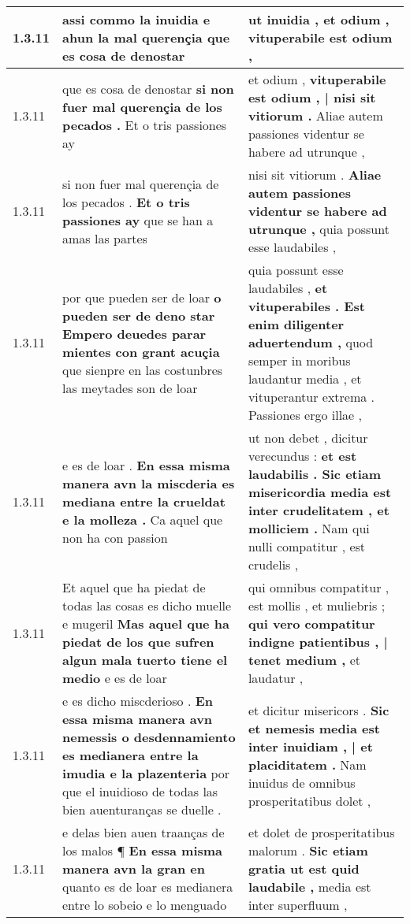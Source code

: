 \begin{tabular}{|p{1cm}|p{6.5cm}|p{6.5cm}|}
1.3.11 & assi commo la inuidia \textbf{ e ahun la mal querençia } que es cosa de denostar & ut inuidia , \textbf{ et odium , } vituperabile est odium , \\\hline
1.3.11 & que es cosa de denostar \textbf{ si non fuer mal querençia de los pecados . } Et o tris passiones ay & et odium , \textbf{ vituperabile est odium , | nisi sit vitiorum . } Aliae autem passiones videntur se habere ad utrunque , \\\hline
1.3.11 & si non fuer mal querençia de los pecados . \textbf{ Et o tris passiones ay } que se han a amas las partes & nisi sit vitiorum . \textbf{ Aliae autem passiones videntur se habere ad utrunque , } quia possunt esse laudabiles , \\\hline
1.3.11 & por que pueden ser de loar \textbf{ o pueden ser de deno star Empero deuedes parar mientes con grant acuçia } que sienpre en las costunbres las meytades son de loar & quia possunt esse laudabiles , \textbf{ et vituperabiles . Est enim diligenter aduertendum , } quod semper in moribus laudantur media , et vituperantur extrema . Passiones ergo illae , \\\hline
1.3.11 & e es de loar . \textbf{ En essa misma manera avn la miscderia es mediana entre la crueldat e la molleza . } Ca aquel que non ha con passion & ut non debet , dicitur verecundus : \textbf{ et est laudabilis . Sic etiam misericordia media est inter crudelitatem , et molliciem . } Nam qui nulli compatitur , est crudelis , \\\hline
1.3.11 & Et aquel que ha piedat de todas las cosas es dicho muelle e mugeril \textbf{ Mas aquel que ha piedat de los que sufren algun mala tuerto tiene el medio } e es de loar & qui omnibus compatitur , est mollis , et muliebris ; \textbf{ qui vero compatitur indigne patientibus , | tenet medium , } et laudatur , \\\hline
1.3.11 & e es dicho miscderioso . \textbf{ En essa misma manera avn nemessis o desdennamiento es medianera entre la imudia e la plazenteria } por que el inuidioso de todas las bien auenturanças se duelle . & et dicitur misericors . \textbf{ Sic et nemesis media est inter inuidiam , | et placiditatem . } Nam inuidus de omnibus prosperitatibus dolet , \\\hline
1.3.11 & e delas bien auen traanças de los malos ¶ \textbf{ En essa misma manera avn la gran en } quanto es de loar es medianera entre lo sobeio e lo menguado & et dolet de prosperitatibus malorum . \textbf{ Sic etiam gratia ut est quid laudabile , } media est inter superfluum , \\\hline

\end{tabular}
